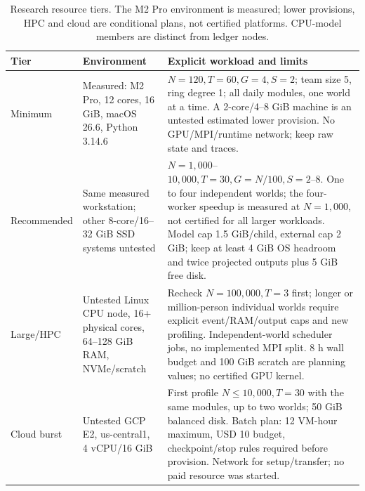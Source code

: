 \begin{table}[tbp]
\centering\small
\caption{Research resource tiers. The M2 Pro environment is measured; lower provisions, HPC and cloud are conditional plans, not certified platforms. CPU-model members are distinct from ledger nodes.}
\label{tab:infrastructure-tiers}
\begin{tabular}{@{}>{\raggedright\arraybackslash}p{}>{\raggedright\arraybackslash}p{}>{\raggedright\arraybackslash}p{}@{}}
\toprule Tier & Environment & Explicit workload and limits \\ \midrule
Minimum & Measured: M2 Pro, 12 cores, 16 GiB, macOS 26.6, Python 3.14.6 & $N=120,T=60,G=4,S=2$; team size 5, ring degree 1; all daily modules, one world at a time. A 2-core/4--8 GiB machine is an untested estimated lower provision. No GPU/MPI/runtime network; keep raw state and traces. \\ \addlinespace
Recommended & Same measured workstation; other 8-core/16--32 GiB SSD systems untested & $N=1{,}000$--$10{,}000,T=30,G=N/100,S=2$--8. One to four independent worlds; the four-worker speedup is measured at $N=1{,}000$, not certified for all larger workloads. Model cap 1.5 GiB/child, external cap 2 GiB; keep at least 4 GiB OS headroom and twice projected outputs plus 5 GiB free disk. \\ \addlinespace
Large/HPC & Untested Linux CPU node, 16+ physical cores, 64--128 GiB RAM, NVMe/scratch & Recheck $N=100{,}000,T=3$ first; longer or million-person individual worlds require explicit event/RAM/output caps and new profiling. Independent-world scheduler jobs, no implemented MPI split. 8 h wall budget and 100 GiB scratch are planning values; no certified GPU kernel. \\ \addlinespace
Cloud burst & Untested GCP E2, us-central1, 4 vCPU/16 GiB & First profile $N\leq10{,}000,T=30$ with the same modules, up to two worlds; 50 GiB balanced disk. Batch plan: 12 VM-hour maximum, USD 10 budget, checkpoint/stop rules required before provision. Network for setup/transfer; no paid resource was started. \\
\bottomrule\end{tabular}
\end{table}
